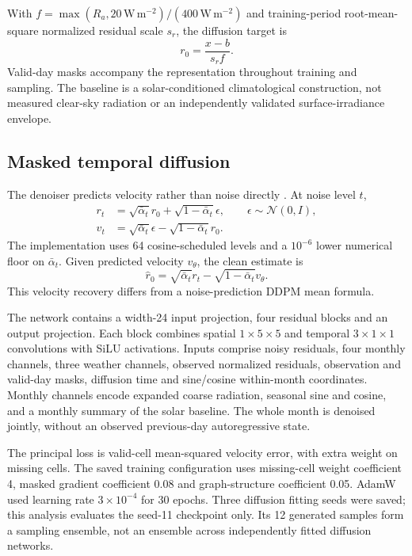 \documentclass[preprint,12pt,authoryear]{elsarticle}
\newcommand{\wm}{\ensuremath{\mathrm{W\,m^{-2}}}}
\begin{document}
With $f=\max(R_a,20\,\wm)/(400\,\wm)$ and training-period root-mean-square normalized residual scale $s_r$, the diffusion target is
\begin{equation}r_0=\frac{x-b}{s_r f}.\label{eq:residual}\end{equation}
Valid-day masks accompany the representation throughout training and sampling. The baseline is a solar-conditioned climatological construction, not measured clear-sky radiation or an independently validated surface-irradiance envelope.

\subsection{Masked temporal diffusion}
The denoiser predicts velocity rather than noise directly \citep{salimans2022}. At noise level $t$,
\begin{align}
r_t&=\sqrt{\bar\alpha_t}r_0+\sqrt{1-\bar\alpha_t}\epsilon,\qquad\epsilon\sim\mathcal N(0,I),\\
v_t&=\sqrt{\bar\alpha_t}\epsilon-\sqrt{1-\bar\alpha_t}r_0.
\end{align}
The implementation uses 64 cosine-scheduled levels and a $10^{-6}$ lower numerical floor on $\bar\alpha_t$. Given predicted velocity $v_\theta$, the clean estimate is
\begin{equation}
\widehat r_0=\sqrt{\bar\alpha_t}r_t-\sqrt{1-\bar\alpha_t}v_\theta.
\label{eq:recover}\end{equation}
This velocity recovery differs from a noise-prediction DDPM mean formula.

The network contains a width-24 input projection, four residual blocks and an output projection. Each block combines spatial $1\times5\times5$ and temporal $3\times1\times1$ convolutions with SiLU activations. Inputs comprise noisy residuals, four monthly channels, three weather channels, observed normalized residuals, observation and valid-day masks, diffusion time and sine/cosine within-month coordinates. Monthly channels encode expanded coarse radiation, seasonal sine and cosine, and a monthly summary of the solar baseline. The whole month is denoised jointly, without an observed previous-day autoregressive state.

The principal loss is valid-cell mean-squared velocity error, with extra weight on missing cells. The saved training configuration uses missing-cell weight coefficient 4, masked gradient coefficient 0.08 and graph-structure coefficient 0.05. AdamW used learning rate $3\times10^{-4}$ for 30 epochs. Three diffusion fitting seeds were saved; this analysis evaluates the seed-11 checkpoint only. Its 12 generated samples form a sampling ensemble, not an ensemble across independently fitted diffusion networks.
\end{document}
